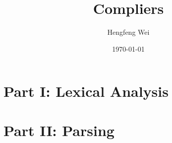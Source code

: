 \documentclass[a4paper, british]{memoir}
\title{Compliers}
\author{Hengfeng Wei}
\date{\today}
\begin{document}
  \frontmatter        %
  \mnfrontpage

  
  

  \cleartorecto
  \tableofcontents    %
  \cleartorecto
  \listoffigures      %
  \cleartorecto
  \listoftables       %

  \mainmatter         %
  
  \part{Part I: Lexical Analysis}
  \part{Part II: Parsing}
    
    
  \appendix
  \appendixpage  %

  \backmatter         %
  \printbibliography
\end{document}
